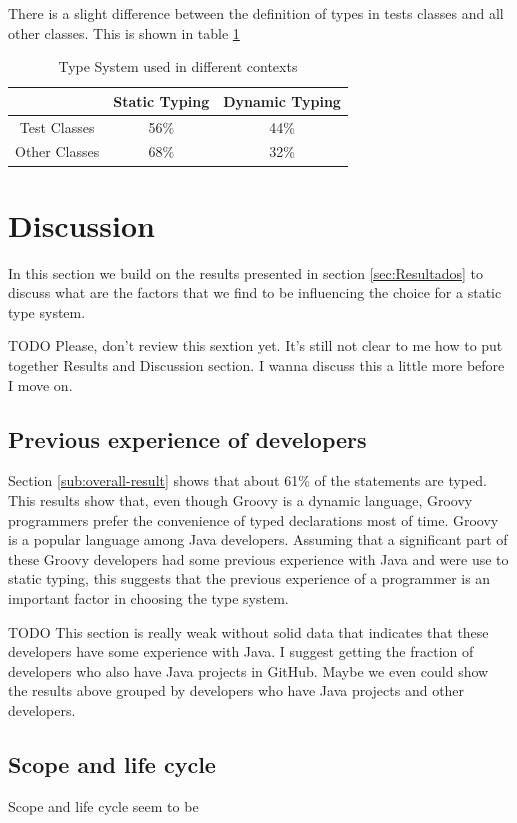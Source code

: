 \documentclass[preprint]{sigplanconf}
\begin{document}
There is a slight difference between the definition of types in tests classes and all other classes. This is shown in table \ref{tab:tests}

\begin{table}[ht]
\caption{Type System used in different contexts}
\centering{}%
\begin{tabular}{|c|c|c|}
\hline 
 & Static Typing & Dynamic Typing\tabularnewline
\hline  
\hline 
Test Classes & 56\% & 44\%\tabularnewline
\hline 
Other Classes & 68\% & 32\%\tabularnewline
\hline 
\end{tabular}
\label{tab:tests}
\end{table}


\section{Discussion\label{sec:Discussion}}

In this section we build on the results presented in section \ref{sec:Resultados} to discuss what are the factors that we find to be influencing the choice for a static type system.

TODO Please, don't review this sextion yet. It's still not clear to me how to put together Results and Discussion section. I wanna discuss this a little more before I move on. 

\subsection{Previous experience of developers\label{sub:previous_experience}}
Section \ref{sub:overall-result} shows that about 61\% of the statements are typed. 
This results show that, even though Groovy is a dynamic language, Groovy programmers prefer the convenience of typed declarations most of time.
Groovy is a popular language among Java developers.
Assuming that a significant part of these Groovy developers had some previous experience with Java and were use to static typing, this suggests that the previous experience of a programmer is an important factor in choosing the type system.

TODO This section is really weak without solid data that indicates that these developers have some experience with Java. I suggest getting the fraction of developers who also have Java projects in GitHub. Maybe we even could show the results above grouped by developers who have Java projects and other developers.

\subsection{Scope and life cycle\label{sub:scope_lifecycle}}
Scope and life cycle seem to be 
\end{document}
